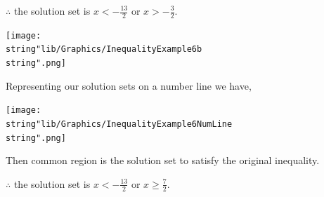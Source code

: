 \documentclass[11pt,a4paper]{book}
\begin{document}
\begin{example}
\begin{minipage}[t]{0.6\textwidth}
$\therefore$ the solution set is ${\displaystyle x<-\frac{13}{2}}$
or ${\displaystyle x>-\frac{3}{2}}$.
\end{minipage}
\begin{minipage}[t]{0.4\textwidth} 
\begin{center}
\texttt{[image: \\string"lib/Graphics/InequalityExample6b\\string".png]}
\par\end{center}
\end{minipage}

Representing our solution sets on a number line we have,
\begin{center}
\texttt{[image: \\string"lib/Graphics/InequalityExample6NumLine\\string".png]}
\par\end{center}

Then common region is the solution set to satisfy the original inequality.

$\therefore$ the solution set is ${\displaystyle x<-\frac{13}{2}}$
or ${\displaystyle x\geq\frac{7}{2}}$.
\end{example}

\newpage
\end{document}
